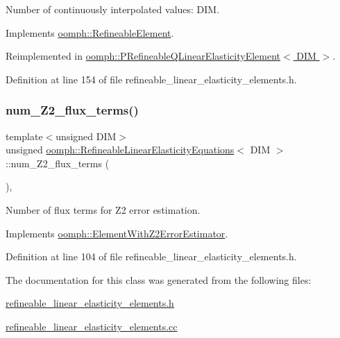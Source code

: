 Number of continuously interpolated values\+: D\+IM. 



Implements \hyperlink{classoomph_1_1RefineableElement_a53e171a18c9f43f1db90a6876516a073}{oomph\+::\+Refineable\+Element}.



Reimplemented in \hyperlink{classoomph_1_1PRefineableQLinearElasticityElement_abdaa00cf9884e4415933748aa2c19672}{oomph\+::\+P\+Refineable\+Q\+Linear\+Elasticity\+Element$<$ D\+I\+M $>$}.



Definition at line 154 of file refineable\+\_\+linear\+\_\+elasticity\+\_\+elements.\+h.

\mbox{\label{classoomph_1_1RefineableLinearElasticityEquations_a6f5a39ae1cdb8be2aeb6176cc093bfed}} 
\subsubsection{\texorpdfstring{num\+\_\+\+Z2\+\_\+flux\+\_\+terms()}{num\_Z2\_flux\_terms()}}
{\footnotesize\ttfamily template$<$unsigned D\+IM$>$ \\
unsigned \hyperlink{classoomph_1_1RefineableLinearElasticityEquations}{oomph\+::\+Refineable\+Linear\+Elasticity\+Equations}$<$ D\+IM $>$\+::num\+\_\+\+Z2\+\_\+flux\+\_\+terms (\begin{DoxyParamCaption}{ }\end{DoxyParamCaption})\hspace{0.3cm}{\ttfamily [inline]}, {\ttfamily [virtual]}}



Number of \textquotesingle{}flux\textquotesingle{} terms for Z2 error estimation. 



Implements \hyperlink{classoomph_1_1ElementWithZ2ErrorEstimator_ae82c5728902e13da31be19c390fc28e3}{oomph\+::\+Element\+With\+Z2\+Error\+Estimator}.



Definition at line 104 of file refineable\+\_\+linear\+\_\+elasticity\+\_\+elements.\+h.



The documentation for this class was generated from the following files\+:\begin{DoxyCompactItemize}
\item 
\hyperlink{refineable__linear__elasticity__elements_8h}{refineable\+\_\+linear\+\_\+elasticity\+\_\+elements.\+h}\item 
\hyperlink{refineable__linear__elasticity__elements_8cc}{refineable\+\_\+linear\+\_\+elasticity\+\_\+elements.\+cc}\end{DoxyCompactItemize}
